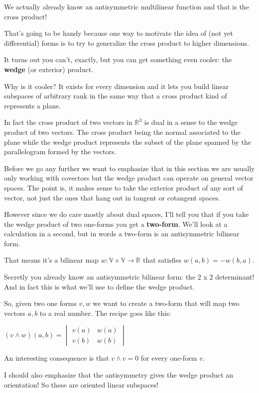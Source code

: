 \documentclass{article}
\theoremstyle{definition}
\begin{document}
We actually already know an antisymmetric multilinear function and that is the
cross product!

That's going to be handy because one way to motivate the idea of (not yet
differential) forms is to try to generalize the cross product to higher
dimensions.

It turns out you can't, exactly, but you can get something even cooler: the
\textbf{wedge} (or exterior) product.

Why is it cooler? It exists for every dimension and it lets you build linear
subspaces of arbitrary rank in the same way that a cross product kind of
represents a plane.

In fact the cross product of two vectors in $\mathbb{R}^{3}$
is dual in a sense to the wedge product of two vectors. The cross product being
the normal associated to the plane while the wedge product represents the subset
of the plane spanned by the parallelogram formed by the vectors.

Before we go any further we want to emphasize that in this section we are
usually only working with covectors but the wedge product can operate on general
vector spaces. The point is, it makes sense to take the exterior product of any sort of vector, not just the
ones that hang out in tangent or cotangent spaces.

However since we do care mostly about dual spaces, I'll tell you that if you take
the wedge product of two one-forms you get a \textbf{two-form}. We'll look at a
calculation in a second, but in words a two-form is an antisymmetric bilinear
form.

That means it's a bilinear map $w: \mathbb{V} \times \mathbb{V} \to \mathbb{R}$
that satisfies $w(a, b) = -w(b, a)$.

Secretly you already know an antisymmetric bilinear form: the 2 x 2 determinant!
And in fact this is what we'll use to define the wedge product.

So, given two one forms $v, w$ we want to create a two-form that will map two
vectors $a, b$ to a real number. The recipe goes like this:

$
(v \wedge w) (a, b) =
\begin{vmatrix}
  v (a) & w (a) \\
  v (b) & w (b)
\end{vmatrix}
$

An interesting consequence is that $v \wedge v = 0$ for every one-form $v$.

I should also emphasize that the antisymmetry gives the wedge product an
orientation! So these are oriented linear subspaces!
\end{document}
